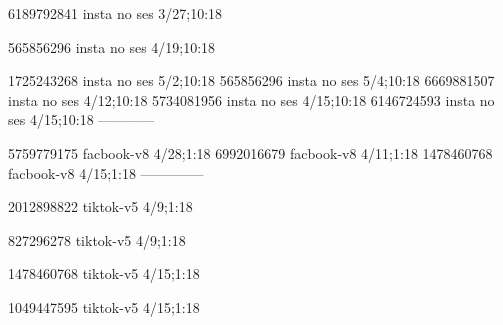 
6189792841 insta no ses
3/27;10:18

565856296 insta no ses
4/19;10:18

1725243268 insta no ses
5/2;10:18
565856296 insta no ses
5/4;10:18
6669881507 insta no ses
4/12;10:18
5734081956 insta no ses
4/15;10:18
6146724593 insta no ses
4/15;10:18
------------


5759779175 facbook-v8
4/28;1:18
6992016679 facbook-v8
4/11;1:18
1478460768 facbook-v8
4/15;1:18
--------------



2012898822 tiktok-v5
4/9;1:18

827296278 tiktok-v5
4/9;1:18

1478460768 tiktok-v5
4/15;1:18

1049447595 tiktok-v5
4/15;1:18
